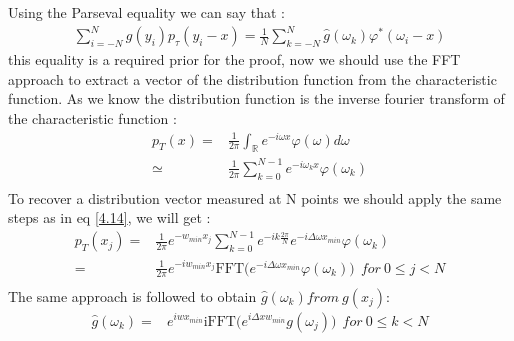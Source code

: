 \documentclass[12pt]{report}
\begin{document}
Using the Parseval equality we can say that :
\begin{align}
\sum_{i=-N}^{N}g(y_i)p_{\tau}(y_i-x)=\frac{1}{N}\sum_{k=-N}^{N}\hat {g}(\omega_k)\varphi^*(\omega_i-x)
\end{align}
this equality is a required prior for the proof, now we should use the FFT approach to extract a vector of the distribution function from the characteristic function.
As we know the distribution function is the inverse fourier transform of the characteristic function :
\begin{align*}
p_T(x)=&\frac{1}{2 \pi}\int_{\mathbb{R}}e^{-i \omega x } \varphi(\omega) d\omega\\
\simeq &\frac{1}{2 \pi}\sum_{k=0}^{N-1}e^{-i \omega_k x } \varphi(\omega_k) \\
\end{align*}
To recover a distribution vector measured at N points we should  apply the same steps as in eq \eqref{4.14}, we will get :
\begin{align}
p_T(x_j)=&\frac{1}{2 \pi} e^{- w_{min} x_j}\sum_{k=0}^{N-1} e^{- i k \frac{2 \pi}{N}} e^{-i \Delta\omega x_{min} } \varphi(\omega_k) \\
\nonumber
=&\frac{1}{2 \pi} e^{- iw_{min} x_j} \text{FFT}\big ( e^{-i \Delta\omega x_{min} } \varphi(\omega_k) \big) ~~for~ 0 \leqslant j < N\\
\label{denstrans}
\end{align}
The same approach is followed to obtain ${\hat g (\omega_k) } from ~g(x_j)$:
\begin{align*}
\hat g (\omega_k)=& e^{i w x_{min}} \text{iFFT}\big ( e^{i \Delta x w_{min} } g(\omega_j) \big) ~~for~ 0 \leqslant k < N\\
\end{align*}
\end{document}
